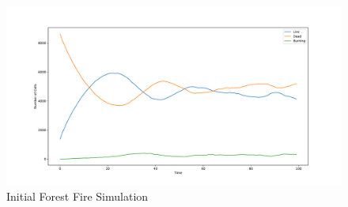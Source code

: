 \documentclass{article}
\begin{document}
\begin{figure}[H]
\centering
\includegraphics[scale=0.3]{Initial Forest Fire.pdf}
\caption{Initial Forest Fire Simulation}\label{fig:initial_fire}
\end{figure}
\end{document}
